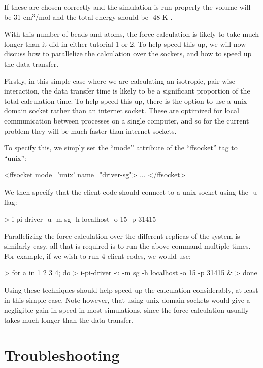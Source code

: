 \documentclass[11pt,english,fleqn]{report}
\newenvironment{code}{%
\footnotesize
\verbatim
}{
\endverbatim
\normalsize
}
\begin{document}
If these are chosen correctly and the simulation is run properly
the volume will be 31 \(\textrm{cm}^3\)/mol and the total energy
should be -48 K \cite{mart+99jcp}.

With this number of beads and atoms, the force calculation is likely
to take much longer than it did in either tutorial 1 or 2.
To help speed this up, we will now discuss how to parallelize the
calculation over the sockets, and how to speed up the data transfer.

Firstly, in this simple case where we are calculating an isotropic,
pair-wise interaction, the data transfer time is likely to be a
significant proportion of the total calculation time. To help speed this
up, there is the option to use a unix domain socket rather than an
internet socket. These are optimized for local communication between
processes on a single computer, and so for the current problem they will be much
faster than internet sockets.

To specify this, we simply set the {}``mode'' attribute of the
{}``\hyperref[FFSOCKET]{ffsocket}'' tag to {}``unix'':

\begin{code}
<ffsocket mode='unix' name="driver-sg">
   ...
</ffsocket>
\end{code}

We then specify that the client code should connect to a unix socket
using the -u flag:

\begin{code}
> i-pi-driver -u -m sg -h localhost -o 15 -p 31415
\end{code}

Parallelizing the force calculation over the different replicas of the system
is similarly easy, all that is required is to run the above
command multiple times. For example, if we wish to run
4 client codes, we would use:

\begin{code}
> for a in 1 2 3 4; do
>    i-pi-driver -u -m sg -h localhost -o 15 -p 31415 &
> done
\end{code}

Using these techniques should help speed up the calculation considerably,
at least in this simple case. Note however, that using unix domain sockets
would give a negligible gain in speed in most simulations,
since the force calculation usually takes much longer than the data transfer.

\chapter{Troubleshooting}
\end{document}
